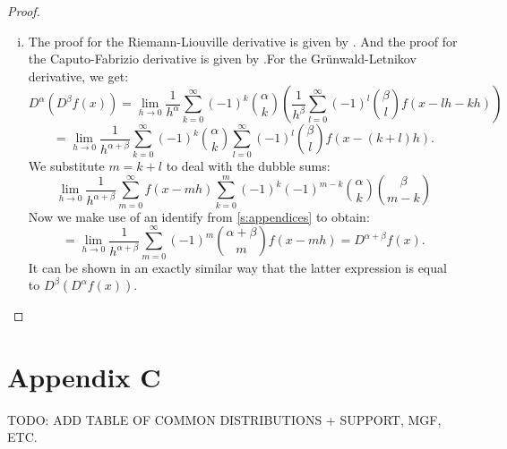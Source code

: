 \begin{proof}
\begin{enumerate}[(i)]
        \item The proof for the Riemann-Liouville derivative is given by \cite{koning15}. And the proof for the Caputo-Fabrizio derivative is given by \cite{losada15}.For the Grünwald-Letnikov derivative, we get:
        \[ D^\alpha(D^\beta f(x)) = \lim_{h \to 0} \frac{1}{h^\alpha} \sum_{k=0}^\infty (-1)^k \binom{\alpha}{k}(  \frac{1}{h^\beta} \sum_{l=0}^\infty (-1)^l \binom{\beta}{l} f(x - l h - kh))\]
        \[= \lim_{h \to 0} \frac{1}{h^{\alpha + \beta}} \sum_{k=0}^\infty (-1)^k \binom{\alpha}{k} \sum_{l=0}^\infty (-1)^l \binom{\beta}{l} f(x - (k + l)h).\] We substitute \(m = k + l\) to deal with the dubble sums: 
        \[ \lim_{h \to 0} \frac{1}{h^{\alpha + \beta}} \sum_{m=0}^\infty f(x - mh)  \sum_{k=0}^m (-1)^k (-1)^{ m - k} \binom{\alpha}{k} \binom{\beta}{m - k}\] Now we make use of an identify from \autoref{s:appendices} to obtain:
        \[ = \lim_{h \to 0} \frac{1}{h^{\alpha + \beta}} \sum_{m=0}^\infty (-1)^m \binom{\alpha + \beta}{m} f(x - mh) = D^{\alpha + \beta} f(x).\]
        It can be shown in an exactly similar way that the latter expression is equal to \(D^\beta(D^\alpha f(x))\).

        
    \end{enumerate}
\end{proof}
\begin{comment}
\subsection{Proofs section \ref{s: moments}}

\begin{proof}
    Theorem \ref{t: negative}:
Suppose for the moment that \( X \) is a positive random variable. Since \( x f(x) \) is integrable for \( x > 0 \), we have:

\[
E(X) = \int_0^\infty x \, dF(x) = \int_0^\infty \int_0^\infty e^{tx} \, dt \, dF(x).
\]

We can interchange the order of integration as follows:

\[
E(X) = \int_0^\infty e^{tx} \, dF(x) \, dt = \int_0^\infty M_X(-t) \, dt.
\]

The interchange of the order of integration is subject to \( E(e^{-tX}) \) being integrable from \( t = 0 \) to \( t = \infty \).

Finally, by substituting \( X^{-1} \) for \( X \), we find:

\[
E(X^{-1}) = \int_0^\infty M_X^{-1}(-t) \, dt.
\]

There are two natural ways to generalize (1) to \( E(X^{-1}) \); one way gives:

\[
E(X^{-n}) = \int_0^\infty \int_0^\infty \cdots \int_0^\infty M_X(-t_n) \, dt_n \cdots dt_2 dt_1, \tag{2}
\]

while the second way gives:

\[
E(X^{-n}) = \frac{1}{\Gamma(n)} \int_0^\infty t^{n-1} M_X(-t) \, dt.
\]
\cite{cressie1981}
\end{proof}
\end{comment}

\section{Appendix C }\label{s: app_C}
TODO: ADD TABLE OF COMMON DISTRIBUTIONS + SUPPORT, MGF, ETC.
